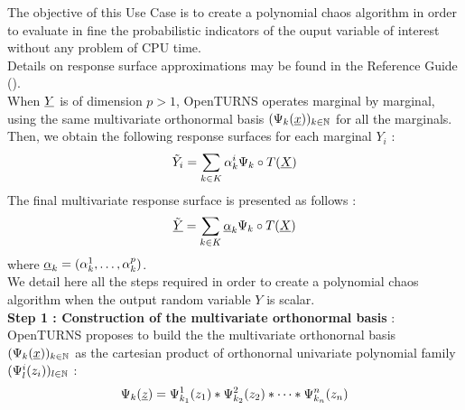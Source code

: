 \renewcommand{\filename}{docUC_RespSurface_PolyChaosExpansion.tex}
\renewcommand{\filetitle}{UC : Creation of a polynomial chaos algorithm}

\HeaderIIILevel


The objective of this Use Case is to create a polynomial chaos algorithm in order to evaluate in fine the probabilistic indicators of the ouput variable of interest without any problem of CPU time.\\



Details on response surface approximations may be found in the Reference Guide ().\\


When ${\underline{Y}}$ is of dimension $p>1$,  OpenTURNS operates marginal by marginal, using the same multivariate orthonormal basis $(\Psi_k({\underline{x}}))_{k \in {\mathbb N}}$ for all the marginals. Then, we obtain the following response surfaces for each marginal $Y_i$ :
\begin{align*}
  \tilde{Y}_i = \sum_{k \in K} \alpha_k^i \Psi_k \circ T({\underline{X}})
\end{align*}
The final multivariate response surface is presented as follows :
\begin{align*}
  \tilde{{\underline{Y}}} = \sum_{k \in K} {\underline{\alpha}}_k \Psi_k \circ T({\underline{X}})
\end{align*}
where ${\underline{\alpha}}_k = ( \alpha_k^1, \dots,  \alpha_k^p)$.\\

We detail here all the steps required in order to create a polynomial chaos algorithm  when the output random variable $Y$ is scalar.\\


{\bf Step 1 : Construction of the multivariate orthonormal basis }: OpenTURNS proposes to build the the multivariate orthonornal basis $(\Psi_k({\underline{x}}))_{k \in {\mathbb N}}$ as the cartesian product of orthonornal univariate polynomial family $(\Psi_{l}^i(z_i))_{l \in {\mathbb N}}$ :
\begin{align*}
  \Psi_k({\underline{z}}) = \Psi_{k_1}^1(z_1) * \Psi_{k_2}^2(z_2) * \dots *  \Psi_{k_n}^n(z_n)
\end{align*}

